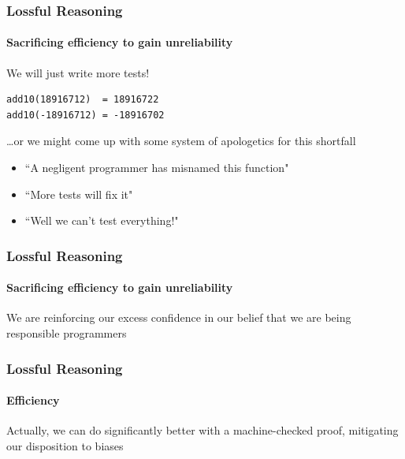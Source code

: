 \begin{frame}[fragile]
\frametitle{Lossful Reasoning}
\framesubtitle{Sacrificing efficiency to gain unreliability}
We will just write more tests!
\begin{lstlisting}[style=scala]
add10(18916712)  = 18916722
add10(-18916712) = -18916702
\end{lstlisting}
\ldots or we might come up with some system of apologetics for this shortfall
\begin{itemize}
  \item ``A negligent programmer has misnamed this function"
  \item ``More tests will fix it"
  \item ``Well we can't test everything!"
\end{itemize}
\end{frame}

\begin{frame}[fragile]
\frametitle{Lossful Reasoning}
\framesubtitle{Sacrificing efficiency to gain unreliability}
\begin{center}{We are reinforcing our excess confidence in our belief that we
are being responsible programmers}
\end{center}
\end{frame}

\begin{frame}[fragile]
\frametitle{Lossful Reasoning}
\framesubtitle{Efficiency}
\begin{center}
Actually, we can do significantly better with a machine-checked proof,
mitigating our disposition to biases
\end{center}
\end{frame}
